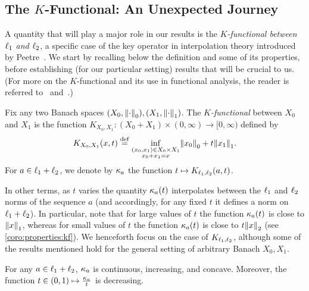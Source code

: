 \subsection{The $K$-Functional: An Unexpected Journey}\label{sec:kfunctional}
A quantity that will play a major role in our results is the \emph{$K$-functional between $\lp[1]$ and $\lp[2]$}, a specific case of the key operator in interpolation theory introduced by Peetre~\cite{Peetre:68}. We start by recalling below the definition and some of its properties, before establishing (for our particular setting) results that will be crucial to us. (For more on the $K$-functional and its use in functional analysis, the reader is referred to~\cite{BennettS:88} and~\cite{Astashkin:2010}.)
\begin{definition}[$K$-functional]\label{def:kfunctional}
Fix any two Banach spaces $(X_0, \norm{\cdot}_0), (X_1, \norm{\cdot}_1)$.
The \emph{$K$-functional} between $X_0$ and $X_1$ is the function $K_{X_0,X_1}\colon (X_0+X_1)\times(0,\infty)\to [0,\infty)$ defined by
\[
    K_{X_0,X_1}(x,t) \eqdef \inf_{\substack{(x_0,x_1)\in X_0\times X_1 \\ x_0+x_1=x}} \norm{x_0}_0 + t\norm{x_1}_1.
\]
For $a\in\lp[1]+\lp[2]$, we denote by $\kf{a}$ the function $t\mapsto K_{\lp[1],\lp[2]}(a,t)$.
\end{definition}

In other terms, as $t$ varies the quantity $\kf{a}(t)$ interpolates between the $\lp[1]$ and $\lp[2]$ norms of the sequence $a$ (and accordingly, for any fixed $t$ it defines a norm on $\lp[1]+\lp[2]$). In particular, note that for large values of $t$ the function $\kf{a}(t)$ is close to $\norm{x}_1$, whereas for small values of $t$ the function $\kf{a}(t)$ is close to $t\norm{x}_2$ (see \cref{coro:properties:kf}). We henceforth focus on the case of $K_{\lp[1],\lp[2]}$, although some of the results mentioned hold for the general setting of arbitrary Banach $X_0,X_1$.

\begin{proposition}\label{prop:kfunctional:basic}
For any $a\in\lp[1]+\lp[2]$, $\kf{a}$ is continuous, increasing, and concave. Moreover, the function $t\in(0,1)\mapsto \frac{\kf{a}}{t}$ is decreasing.
\end{proposition}


